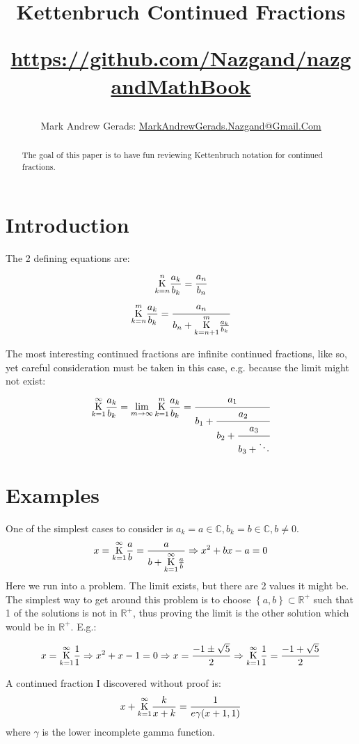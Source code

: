 \documentclass[]{article}
\author{Mark Andrew Gerads: \href{MailTo:MarkAndrewGerads.Nazgand@Gmail.Com}{MarkAndrewGerads.Nazgand@Gmail.Com}}
\title{
	Kettenbruch Continued Fractions
	
	\href{https://github.com/Nazgand/nazgandMathBook}{https://github.com/Nazgand/nazgandMathBook}
}
\newcommand{\Bqty}[1]{{\left\{#1\right\}}}
\newcommand{\ketten}[4]{\underset{#1}{\overset{#2}{\LARGE\mathrm K}}\frac{#3}{#4}}
\numberwithin{equation}{section}
\begin{document}
	
	\maketitle
	
	\begin{abstract}
		The goal of this paper is to have fun reviewing Kettenbruch notation for continued fractions.
	\end{abstract}
	
	\section{Introduction}
	The 2 defining equations are:
	\begin{equation}
		\ketten{k=n}{n}{a_k}{b_k}=\cfrac{a_n}{b_n}
	\end{equation}
	\begin{equation}
		\ketten{k=n}{m}{a_k}{b_k}=\cfrac{a_n}{b_n+\ketten{k=n+1}{m}{a_k}{b_k}}
	\end{equation}

	The most interesting continued fractions are infinite continued fractions, like so, yet careful consideration must be taken in this case, e.g. because the limit might not exist:
	\begin{equation}
		\ketten{k=1}{\infty}{a_k}{b_k}=
		\lim_{m\to\infty}\ketten{k=1}{m}{a_k}{b_k}=
		\cfrac{a_1}{b_1+\cfrac{a_2}{b_2+\cfrac{a_3}{b_3+\ddots}}}
	\end{equation}

	\section{Examples}
	One of the simplest cases to consider is $a_k=a\in\mathbb{C},b_k=b\in\mathbb{C},b\neq 0$.
	\begin{equation}
		x=\ketten{k=1}{\infty}{a}{b}=\frac{a}{b+\ketten{k=1}{\infty}{a}{b}}
		\Rightarrow
		x^2+bx-a=0
	\end{equation}
	Here we run into a problem. The limit exists, but there are 2 values it might be. The simplest way to get around this problem is to choose $\Bqty{a,b}\subset\mathbb{R}^+$ such that 1 of the solutions is not in $\mathbb{R}^+$, thus proving the limit is the other solution which would be in $\mathbb{R}^+$. E.g.:

	\begin{equation}
		x=\ketten{k=1}{\infty}{1}{1}
		\Rightarrow
		x^2+x-1=0
		\Rightarrow
		x=\frac{-1\pm\sqrt{5}}{2}
		\Rightarrow
		\ketten{k=1}{\infty}{1}{1}=\frac{-1+\sqrt{5}}{2}
	\end{equation}

	A continued fraction I discovered without proof is:
	\begin{equation}
		x+\ketten{k=1}{\infty}{k}{x+k}=\frac{1}{e \gamma (x+1,1)}
	\end{equation}
	where $\gamma$ is the lower incomplete gamma function.
\end{document}
